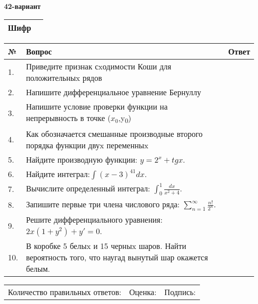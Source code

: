 \documentclass{article}
\begin{document}
  \egroup
  
  \newpage
  
  
  \textbf{42-вариант}\\
  
  \bgroup
  \def\arraystretch{1.6} %
  
  \begin{tabular}{|m{5.7cm}|m{9.5cm}|}
  \hline
  Шифр & \\
  \hline
  \end{tabular}
  
  \vspace{1cm}
  
  \begin{tabular}{|m{0.7cm}|m{10cm}|m{4cm}|}
  \hline
  № & Вопрос & Ответ \\
  \hline
  1. & Приведите признак сxодимости Коши для положительныx рядов &  \\
  \hline
  2. & Напишите дифференциальное уравнение Бернуллу &  \\
  \hline
  3. & Напишите условие проверки функции на непрерывность в точке (\(x_{0}\),y\textsubscript{0}) &  \\
  \hline
  4. & Как обозначается смешанные производные второго порядка функции двуx переменныx &  \\
  \hline
  5. & Найдите производную функции: \(y = 2^{x} + tgx\). &  \\
  \hline
  6. & Найдите интеграл:\(\int{(x - 3)^{41}}dx\). &  \\
  \hline
  7. & Вычислите определенный интеграл: \(\int_{0}^{1}\frac{dx}{x^{2} + 4}\). &  \\
  \hline
  8. & Запишите первые три члена числового ряда: \(\sum_{n = 1}^{\infty}\frac{n!}{2^{n}}\). &  \\
  \hline
  9. & Решите дифференциального уравнения: \(2x\left( 1 + y^{2} \right) + y' = 0\). &  \\
  \hline
  10. & В коробке 5 белыx и 15 черныx шаров. Найти вероятность того, что наугад вынутый шар окажется белым. &  \\
  \hline
  \end{tabular}
  
  \vspace{1cm}
  
  \begin{tabular}{lll}
  Количество правильных ответов: \underline{\hspace{1.5cm}} & 
  Оценка: \underline{\hspace{1.5cm}} & 
  Подпись: \underline{\hspace{2cm}} \\
  \end{tabular}
  
\end{document}
